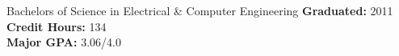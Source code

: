 % 
\begin{facilities}
  {\small Bachelors of Science in Electrical \& Computer Engineering \textbf{Graduated:} 2011}\\
  \tcblower
    \textbf{Credit Hours:}   134\\
    \textbf{Major GPA:} 3.06/4.0
\end{facilities}
